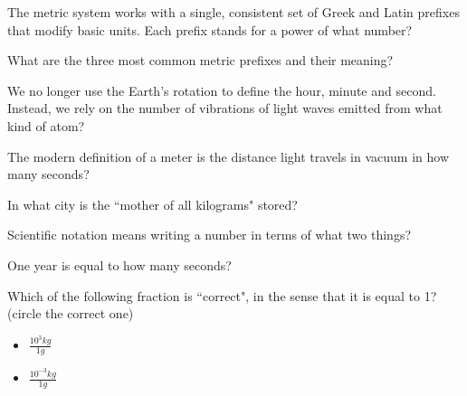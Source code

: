 \documentclass[addpoints,12pt]{exam}
\begin{document}
\begin{questions}

\question[1]
The metric system works with a single, consistent set of Greek and Latin prefixes that modify basic units. Each prefix stands for a power of what number?
\fillwithlines{0.5in}

\question[3]
What are the three most common metric prefixes and their meaning?
\fillwithlines{0.75in}

\question[1]
We no longer use the Earth's rotation to define the hour, minute and second. Instead, we rely on the number of vibrations of light waves emitted from what kind of atom?
\fillwithlines{0.5in}

\question[1]
The modern definition of a meter is the distance light travels in vacuum in how many seconds?
\fillwithlines{0.5in}

\question[1]
In what city is the ``mother of all kilograms" stored?
\fillwithlines{0.5in}

\question[1]
Scientific notation means writing a number in terms of what two things?
\fillwithlines{0.5in}

\question[1]
One year is equal to how many seconds?
\fillwithlines{0.5in}

\question[1]
Which of the following fraction is ``correct", in the sense that it is equal to 1? (circle the correct one)
\begin{itemize}
\item $\frac{10^3 kg}{1 g}$
\item $\frac{10^{-3} kg}{1 g}$
\end{itemize}

\end{questions}
\end{document}
